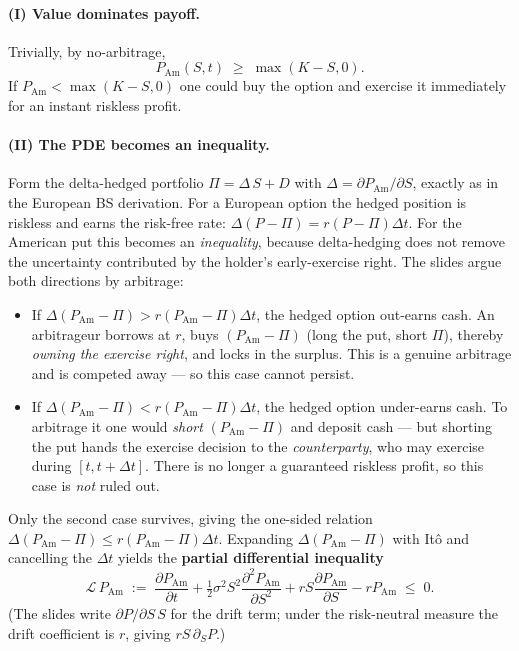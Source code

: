 \documentclass[11pt]{article}
\begin{document}
\paragraph{(I) Value dominates payoff.} Trivially, by no-arbitrage,
\begin{equation}\label{eq:ineq1}
P_{\mathrm{Am}}(S,t)\;\ge\;\max(K-S,0).
\end{equation}
If $P_{\mathrm{Am}}<\max(K-S,0)$ one could buy the option and exercise it immediately for an instant riskless
profit.

\paragraph{(II) The PDE becomes an inequality.} Form the delta-hedged portfolio
$\Pi=\Delta\,S+D$ with $\Delta=\partial P_{\mathrm{Am}}/\partial S$, exactly as in the European BS derivation.
For a European option the hedged position is riskless and earns the risk-free rate:
$\Delta(P-\Pi)=r(P-\Pi)\Delta t$. For the American put this becomes an \emph{inequality}, because delta-hedging
does not remove the uncertainty contributed by the holder's early-exercise right. The slides argue both
directions by arbitrage:
\begin{itemize}[leftmargin=*]
  \item If $\Delta(P_{\mathrm{Am}}-\Pi)>r(P_{\mathrm{Am}}-\Pi)\Delta t$, the hedged option out-earns cash. An
  arbitrageur borrows at $r$, buys $(P_{\mathrm{Am}}-\Pi)$ (long the put, short $\Pi$), thereby \emph{owning
  the exercise right}, and locks in the surplus. This is a genuine arbitrage and is competed away --- so this
  case cannot persist.
  \item If $\Delta(P_{\mathrm{Am}}-\Pi)<r(P_{\mathrm{Am}}-\Pi)\Delta t$, the hedged option under-earns cash. To
  arbitrage it one would \emph{short} $(P_{\mathrm{Am}}-\Pi)$ and deposit cash --- but shorting the put hands
  the exercise decision to the \emph{counterparty}, who may exercise during $[t,t+\Delta t]$. There is no longer
  a guaranteed riskless profit, so this case is \emph{not} ruled out.
\end{itemize}
Only the second case survives, giving the one-sided relation
$\Delta(P_{\mathrm{Am}}-\Pi)\le r(P_{\mathrm{Am}}-\Pi)\Delta t$. Expanding $\Delta(P_{\mathrm{Am}}-\Pi)$ with
It\^o and cancelling the $\Delta t$ yields the \textbf{partial differential inequality}
\begin{equation}\label{eq:pdineq}
\mathcal L\,P_{\mathrm{Am}}\;:=\;\frac{\partial P_{\mathrm{Am}}}{\partial t}
+\tfrac12\sigma^2 S^2\frac{\partial^2 P_{\mathrm{Am}}}{\partial S^2}
+rS\frac{\partial P_{\mathrm{Am}}}{\partial S}-rP_{\mathrm{Am}}\;\le\;0 .
\end{equation}
(The slides write $\partial P/\partial S\,S$ for the drift term; under the risk-neutral measure the drift
coefficient is $r$, giving $rS\,\partial_S P$.)
\end{document}

